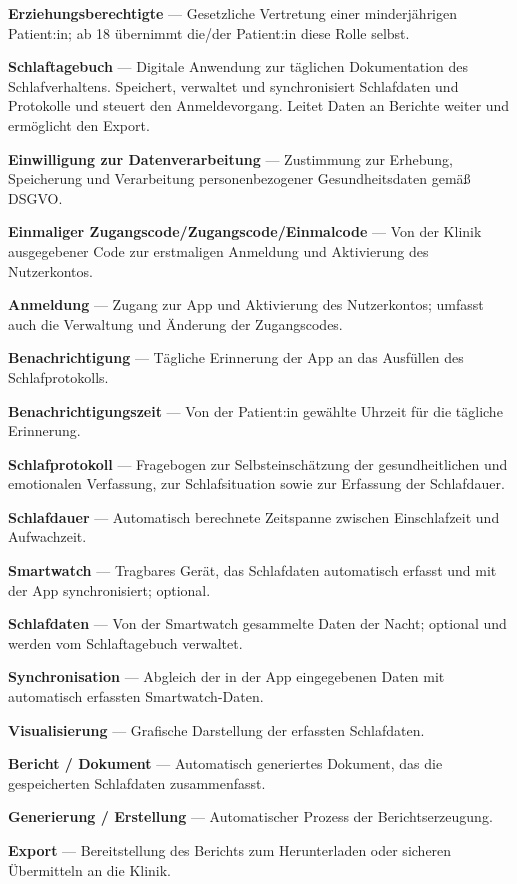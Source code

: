 \textbf{Erziehungsberechtigte} — Gesetzliche Vertretung einer minderjährigen Patient:in; ab 18 übernimmt die/der Patient:in diese Rolle selbst. 

\textbf{Schlaftagebuch} — Digitale Anwendung zur täglichen Dokumentation des Schlafverhaltens. Speichert, verwaltet und synchronisiert Schlafdaten und Protokolle und steuert den Anmeldevorgang. Leitet Daten an Berichte weiter und ermöglicht den Export. 

\textbf{Einwilligung zur Datenverarbeitung} — Zustimmung zur Erhebung, Speicherung und Verarbeitung personenbezogener Gesundheitsdaten gemäß DSGVO. 

\textbf{Einmaliger Zugangscode/Zugangscode/Einmalcode} — Von der Klinik ausgegebener Code zur erstmaligen Anmeldung und Aktivierung des Nutzerkontos. 

\textbf{Anmeldung} — Zugang zur App und Aktivierung des Nutzerkontos; umfasst auch die Verwaltung und Änderung der Zugangscodes.

\textbf{Benachrichtigung} — Tägliche Erinnerung der App an das Ausfüllen des Schlafprotokolls.

\textbf{Benachrichtigungszeit} — Von der Patient:in gewählte Uhrzeit für die tägliche Erinnerung.

\textbf{Schlafprotokoll} — Fragebogen zur Selbsteinschätzung der gesundheitlichen und emotionalen Verfassung, zur Schlafsituation sowie zur Erfassung der Schlafdauer.

\textbf{Schlafdauer} — Automatisch berechnete Zeitspanne zwischen Einschlafzeit und Aufwachzeit.

\textbf{Smartwatch} — Tragbares Gerät, das Schlafdaten automatisch erfasst und mit der App synchronisiert; optional.

\textbf{Schlafdaten} — Von der Smartwatch gesammelte Daten der Nacht; optional und werden vom Schlaftagebuch verwaltet. 

\textbf{Synchronisation} — Abgleich der in der App eingegebenen Daten mit automatisch erfassten Smartwatch-Daten. 

\textbf{Visualisierung} — Grafische Darstellung der erfassten Schlafdaten.

\textbf{Bericht / Dokument} — Automatisch generiertes Dokument, das die gespeicherten Schlafdaten zusammenfasst.

\textbf{Generierung / Erstellung} — Automatischer Prozess der Berichtserzeugung.

\textbf{Export} — Bereitstellung des Berichts zum Herunterladen oder sicheren Übermitteln an die Klinik.

